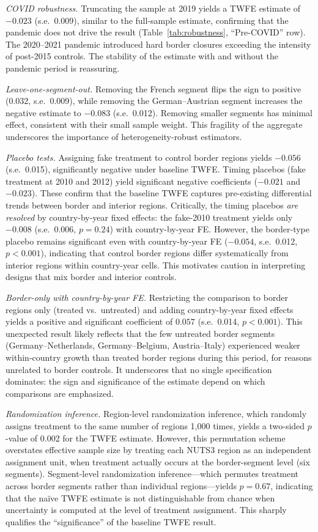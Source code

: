 \documentclass[12pt]{article}
\begin{document}
\textit{COVID robustness.} Truncating the sample at 2019 yields a TWFE estimate of $-0.023$ (s.e.\ 0.009), similar to the full-sample estimate, confirming that the pandemic does not drive the result (Table~\ref{tab:robustness}, ``Pre-COVID'' row). The 2020--2021 pandemic introduced hard border closures exceeding the intensity of post-2015 controls. The stability of the estimate with and without the pandemic period is reassuring.

\textit{Leave-one-segment-out.} Removing the French segment flips the sign to positive (0.032, s.e.\ 0.009), while removing the German--Austrian segment increases the negative estimate to $-0.083$ (s.e.\ 0.012). Removing smaller segments has minimal effect, consistent with their small sample weight. This fragility of the aggregate underscores the importance of heterogeneity-robust estimators.

\textit{Placebo tests.} Assigning fake treatment to control border regions yields $-0.056$ (s.e.\ 0.015), significantly negative under baseline TWFE. Timing placebos (fake treatment at 2010 and 2012) yield significant negative coefficients ($-0.021$ and $-0.023$). These confirm that the baseline TWFE captures pre-existing differential trends between border and interior regions. Critically, the timing placebos \textit{are resolved} by country-by-year fixed effects: the fake-2010 treatment yields only $-0.008$ (s.e.\ 0.006, $p = 0.24$) with country-by-year FE. However, the border-type placebo remains significant even with country-by-year FE ($-0.054$, s.e.\ 0.012, $p < 0.001$), indicating that control border regions differ systematically from interior regions within country-year cells. This motivates caution in interpreting designs that mix border and interior controls.

\textit{Border-only with country-by-year FE.} Restricting the comparison to border regions only (treated vs.\ untreated) and adding country-by-year fixed effects yields a positive and significant coefficient of $0.057$ (s.e.\ 0.014, $p < 0.001$). This unexpected result likely reflects that the few untreated border segments (Germany--Netherlands, Germany--Belgium, Austria--Italy) experienced weaker within-country growth than treated border regions during this period, for reasons unrelated to border controls. It underscores that no single specification dominates: the sign and significance of the estimate depend on which comparisons are emphasized.

\textit{Randomization inference.} Region-level randomization inference, which randomly assigns treatment to the same number of regions 1,000 times, yields a two-sided $p$-value of 0.002 for the TWFE estimate. However, this permutation scheme overstates effective sample size by treating each NUTS3 region as an independent assignment unit, when treatment actually occurs at the border-segment level (six segments). Segment-level randomization inference---which permutes treatment across border segments rather than individual regions---yields $p = 0.67$, indicating that the na\"ive TWFE estimate is not distinguishable from chance when uncertainty is computed at the level of treatment assignment. This sharply qualifies the ``significance'' of the baseline TWFE result.
\end{document}
